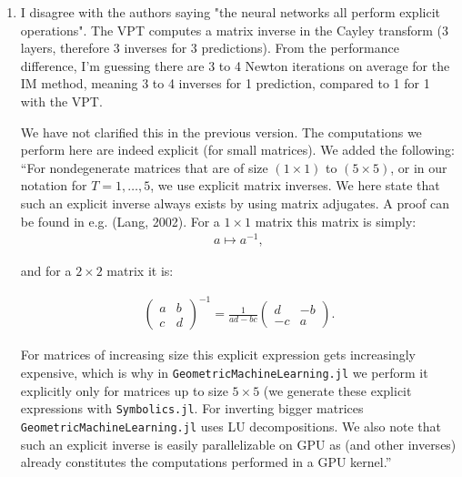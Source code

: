 \documentclass{article}
\begin{document}
\begin{enumerate}
    \item I disagree with the authors saying "the neural networks all perform explicit operations". The VPT computes a matrix inverse in the Cayley transform (3 layers, therefore 3 inverses for 3 predictions). From the performance difference, I'm guessing there are 3 to 4 Newton iterations on average for the IM method, meaning 3 to 4 inverses for 1 prediction, compared to 1 for 1 with the VPT.

    {\color{mred}

    We have not clarified this in the previous version. The computations we perform here are indeed explicit (for small matrices). We added the following:
    ``For nondegenerate matrices that are of size \((1\times1)\) to \((5\times5)\), or in our notation for \(T = 1, \ldots, 5\), we use explicit matrix inverses. We here state that such an explicit inverse always exists by using matrix adjugates. A proof can be found in e.g. (Lang, 2002). For a \(1\times1\) matrix this matrix is simply:
    \begin{equation*}
    \begin{split}a \mapsto a^{-1},\end{split}
    \end{equation*}
    
    and for a \(2\times2\) matrix it is:
    
    \begin{equation}
    \begin{split}\begin{pmatrix} a & b \\ c & d \end{pmatrix}^{-1} = \frac{1}{ad - bc}\begin{pmatrix} d & -b \\ -c & a \end{pmatrix}.
    \end{split}\label{eq:inverse2}
    \end{equation}

    For matrices of increasing size this explicit expression gets increasingly expensive, which is why in \texttt{GeometricMachineLearning.jl} we perform it explicitly only for matrices up to size \(5\times5\) (we generate these explicit expressions with \texttt{Symbolics.jl}. For inverting bigger matrices \texttt{GeometricMachineLearning.jl} uses LU decompositions. We also note that such an explicit inverse is easily parallelizable on GPU as  (and other inverses) already constitutes the computations performed in a GPU kernel.''

}
\end{enumerate}
\end{document}
